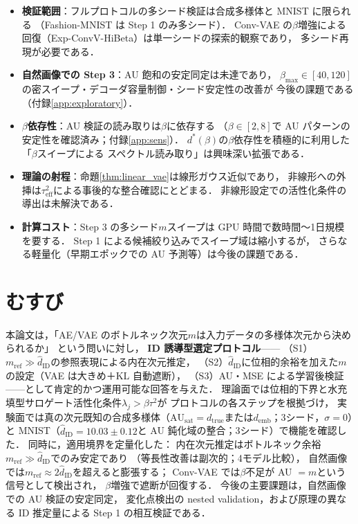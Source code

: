 \documentclass[11pt,a4paper]{jsarticle}
\newcommand{\hatdID}{\hat{d}_{\mathrm{ID}}}
\newcommand{\dtrue}{d_{\mathrm{true}}}
\newcommand{\AUsat}{\mathrm{AU}_{\mathrm{sat}}}
\newcommand{\demb}{d_{\mathrm{emb}}}
\newcommand{\dstar}{d^{*}(\beta)}
\begin{document}
\begin{itemize}
  \item \textbf{検証範囲}：フルプロトコルの多シード検証は合成多様体と MNIST に限られる
        （Fashion-MNIST は Step 1 のみ多シード）．
        Conv-VAE の$\beta$増強による回復（Exp-ConvV-HiBeta）は単一シードの探索的観察であり，
        多シード再現が必要である．
  \item \textbf{自然画像での Step 3}：AU 飽和の安定同定は未達であり，
        $\beta_{\max} \in [40, 120]$の密スイープ・デコーダ容量制御・シード安定性の改善が
        今後の課題である（付録\ref{app:exploratory}）．
  \item \textbf{$\beta$依存性}：AU 検証の読み取りは$\beta$に依存する
        （$\beta \in [2, 8]$で AU パターンの安定性を確認済み；付録\ref{app:sens}）．
        $\dstar$の$\beta$依存性を積極的に利用した「$\beta$スイープによる
        スペクトル読み取り」は興味深い拡張である．
  \item \textbf{理論の射程}：命題\ref{thm:linear_vae}は線形ガウス近似であり，
        非線形への外挿は$\tau^2_{\mathrm{eff}}$による事後的な整合確認にとどまる．
        非線形設定での活性化条件の導出は未解決である．
  \item \textbf{計算コスト}：Step 3 の多シード$m$スイープは GPU 時間で数時間〜1日規模を要する．
        Step 1 による候補絞り込みでスイープ域は縮小するが，
        さらなる軽量化（早期エポックでの AU 予測等）は今後の課題である．
\end{itemize}

\section{むすび}\label{sec:conclusion}

本論文は，「AE/VAE のボトルネック次元$m$は入力データの多様体次元から決められるか」
という問いに対し，
\textbf{ID 誘導型選定プロトコル}——
（S1）$m_{\mathrm{ref}} \gg \hatdID$の参照表現による内在次元推定，
（S2）$\hatdID$に位相的余裕を加えた$m$の設定（VAE は大きめ＋KL 自動遮断），
（S3）AU・MSE による学習後検証——として肯定的かつ運用可能な回答を与えた．
理論面では位相的下界と水充填型サロゲート活性化条件$\lambda_j > \beta\tau^2$が
プロトコルの各ステップを根拠づけ，
実験面では真の次元既知の合成多様体（$\AUsat = \dtrue$または$\demb$；3シード，$\sigma = 0$）と
MNIST（$\hatdID = 10.03 \pm 0.12$と AU 鈍化域の整合；3シード）で機能を確認した．
同時に，適用境界を定量化した：
内在次元推定はボトルネック余裕$m_{\mathrm{ref}} \gg \hatdID$でのみ安定であり
（等長性改善は副次的；4モデル比較），
自然画像では$m_{\mathrm{ref}} \approx 2\hatdID$を超えると膨張する；
Conv-VAE では$\beta$不足が AU $= m$という信号として検出され，
$\beta$増強で遮断が回復する．
今後の主要課題は，自然画像での AU 検証の安定同定，
変化点検出の nested validation，および原理の異なる ID 推定量による Step 1 の相互検証である．
\end{document}
